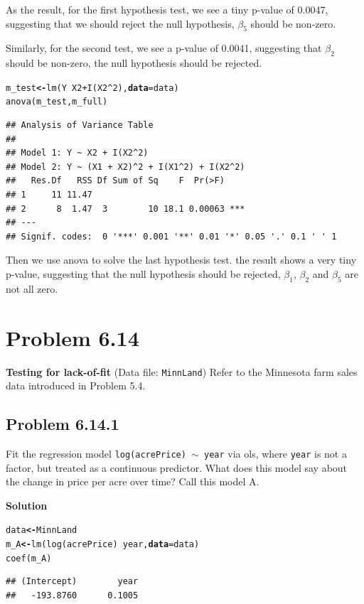 \documentclass[12pt,oneside,a4paper]{article}\usepackage[]{graphicx}\usepackage[]{xcolor}
\makeatletter
\newcommand{\hlnum}[1]{\textcolor[rgb]{0,0,0}{#1}}%
\newcommand{\hlopt}[1]{\textcolor[rgb]{0,0,0}{#1}}%
\newcommand{\hlstd}[1]{\textcolor[rgb]{0,0,0}{#1}}%
\newcommand{\hlkwb}[1]{\textcolor[rgb]{0.498,0,0.333}{\textbf{#1}}}%
\newcommand{\hlkwc}[1]{\textcolor[rgb]{0.498,0,0.333}{\textbf{#1}}}%
\newcommand{\hlkwd}[1]{\textcolor[rgb]{0,0,0}{#1}}%
\newenvironment{kframe}{%
 \def\at@end@of@kframe{}%
 \ifinner\ifhmode%
  \def\at@end@of@kframe{\end{minipage}}%
  \begin{minipage}{\columnwidth}%
 \fi\fi%
 \def\FrameCommand##1{\hskip\@totalleftmargin \hskip-\fboxsep
 \colorbox{shadecolor}{##1}\hskip-\fboxsep
     \hskip-\linewidth \hskip-\@totalleftmargin \hskip\columnwidth}%
 \MakeFramed {\advance\hsize-\width
   \@totalleftmargin\z@ \linewidth\hsize
   \@setminipage}}%
 {\par\unskip\endMakeFramed%
 \at@end@of@kframe}
\newenvironment{knitrout}{}{} %
\newcommand{\problem}[1]
{
    \clearpage
    \section*{Problem {#1}}
}
\newcommand{\subproblem}[1]
{
    \subsection*{Problem {#1}}
}
\newcommand{\solution}
{
    \vspace{15pt}
    \noindent\ignorespaces\textbf{\large Solution}
}
\newcommand{\m}[1]{\texttt{{#1}}}
\makeatother
\begin{document}
As the result, for the first hypothesis test, we see a tiny p-value of 0.0047, suggesting that we should reject the null hypothesis, $\beta_{5}$ should be non-zero.

Similarly, for the second test, we see a p-value of 0.0041, suggesting that $\beta_{2}$ should be non-zero, the null hypothesis should be rejected.

\begin{knitrout}
\color{fgcolor}\begin{kframe}
\begin{alltt}
\hlstd{m_test} \hlkwb{<-} \hlkwd{lm}\hlstd{(Y} \hlopt{~} \hlstd{X2} \hlopt{+} \hlkwd{I}\hlstd{(X2} \hlopt{^} \hlnum{2}\hlstd{),} \hlkwc{data} \hlstd{= data)}
\hlkwd{anova}\hlstd{(m_test, m_full)}
\end{alltt}
\begin{verbatim}
## Analysis of Variance Table
## 
## Model 1: Y ~ X2 + I(X2^2)
## Model 2: Y ~ (X1 + X2)^2 + I(X1^2) + I(X2^2)
##   Res.Df   RSS Df Sum of Sq    F  Pr(>F)    
## 1     11 11.47                              
## 2      8  1.47  3        10 18.1 0.00063 ***
## ---
## Signif. codes:  0 '***' 0.001 '**' 0.01 '*' 0.05 '.' 0.1 ' ' 1
\end{verbatim}
\end{kframe}
\end{knitrout}

Then we use anova to solve the last hypothesis test. the result shows a very tiny p-value, suggesting that the null hypothesis should be rejected, $\beta_{1}$, $\beta_{2}$ and $\beta_{5}$ are not all zero. 

\problem{6.14}
\textbf{Testing for lack-of-fit} (Data file: \m{MinnLand}) Refer to the Minnesota farm sales data introduced in Problem 5.4.

\subproblem{6.14.1}
Fit the regression model \m{log(acrePrice) $\sim$ year} via ols, where \m{year} is not a factor, but treated as a continuous predictor. What does this model say about the change in price per acre over time? Call this model A.

\solution
\begin{knitrout}
\color{fgcolor}\begin{kframe}
\begin{alltt}
\hlstd{data} \hlkwb{<-} \hlstd{MinnLand}
\hlstd{m_A} \hlkwb{<-} \hlkwd{lm}\hlstd{(}\hlkwd{log}\hlstd{(acrePrice)} \hlopt{~} \hlstd{year,} \hlkwc{data} \hlstd{= data)}
\hlkwd{coef}\hlstd{(m_A)}
\end{alltt}
\begin{verbatim}
## (Intercept)        year 
##   -193.8760      0.1005
\end{verbatim}
\end{kframe}
\end{knitrout}
\end{document}
